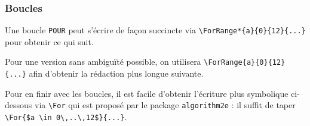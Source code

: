 

\subsubsection{Boucles}

Une boucle \verb+POUR+ peut s'écrire de façon succincte via \verb+\ForRange*{a}{0}{12}{...}+ pour obtenir ce qui suit.

\begin{algo}[.55]
\end{algo}


\medskip


Pour une version sans ambiguïté possible, on utilisera \verb+\ForRange{a}{0}{12}{...}+ afin d'obtenir la rédaction plus longue suivante.

\begin{algo}[.55]
\end{algo}


\medskip


Pour en finir avec les boucles, il est facile d'obtenir l'écriture plus symbolique ci-dessous via \verb+\For+ qui est proposé par le package \verb+algorithm2e+ : il suffit de taper \verb+\For{$a \in 0\,..\,12$}{...}+.

\begin{algo}[.55]
\end{algo}

